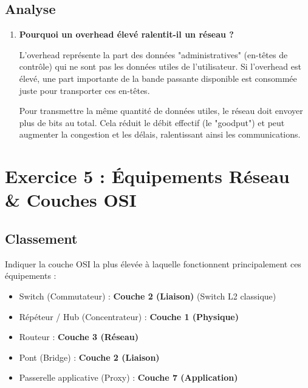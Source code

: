 \documentclass[11pt, a4paper]{article}
\newenvironment{reponse}{\begin{reponsebox}}{\end{reponsebox}}
\begin{document}
\subsection{Analyse}
\begin{enumerate}
    \item \textbf{Pourquoi un overhead élevé ralentit-il un réseau ?}
    \begin{reponse}
    L'overhead représente la part des données "administratives" (en-têtes de contrôle) qui ne sont pas les données utiles de l'utilisateur. Si l'overhead est élevé, une part importante de la bande passante disponible est consommée juste pour transporter ces en-têtes.

    Pour transmettre la même quantité de données utiles, le réseau doit envoyer plus de bits au total. Cela réduit le débit effectif (le "goodput") et peut augmenter la congestion et les délais, ralentissant ainsi les communications.
    \end{reponse}
\end{enumerate}

\section{Exercice 5 : Équipements Réseau \& Couches OSI}

\subsection{Classement}
Indiquer la couche OSI la plus élevée à laquelle fonctionnent principalement ces équipements :
\begin{itemize}
    \item Switch (Commutateur) : \textbf{Couche 2 (Liaison)} (Switch L2 classique)
    \item Répéteur / Hub (Concentrateur) : \textbf{Couche 1 (Physique)}
    \item Routeur : \textbf{Couche 3 (Réseau)}
    \item Pont (Bridge) : \textbf{Couche 2 (Liaison)}
    \item Passerelle applicative (Proxy) : \textbf{Couche 7 (Application)}
\end{itemize}
\end{document}
